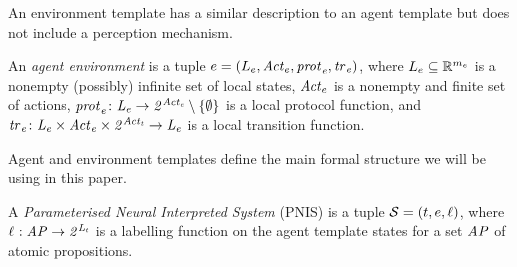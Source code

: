     





An environment template has a similar description to an agent template but does
not include a perception mechanism.

\begin{definition}
An {\em agent environment} is a tuple ${e} = \left ( L_{e}, \mathit{Act}_{e}, \it{prot}_{e}, \it{tr}_{e}  \right )$, where $L_{e}  \subseteq \mathbb R^{m_e}$ is a nonempty
(possibly) infinite set of local states, $\mathit{Act}_{e}$ is a nonempty and finite set
of actions,  $\it{prot}_{e} \colon L_{e}\rightarrow 2^{\mathit{Act}_{e}} \setminus \left \{ \emptyset \right \}$ is a local
protocol function, and $\it{tr}_{e} \colon L_{e} \times \mathit{Act}_{e} \times 2^{\mathit{Act}_{t}} 
\rightarrow L_{e}$ is a local transition function.
\end{definition}

Agent and environment templates define the main formal structure we will be
using in this paper.

\begin{definition}
  A {\em Parameterised Neural Interpreted System} (PNIS) is a tuple $\mathcal S
  = \left ( {t}, {e}, \ell \right )$, where $\ell_{} : \it{AP} \rightarrow
  2^{L_{t}}$ is a labelling function on the agent  template states for a set
  $\it{AP}$ of atomic propositions.
\end{definition}

